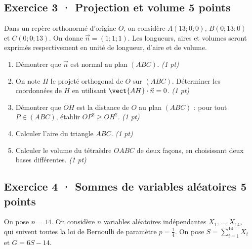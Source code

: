 \clearpage{}\par

\subsection*{Exercice 3 · Projection et volume \hfill 5 points}Dans un repère orthonormé d'origine $O$, on considère $A(13;0;0)$, $B(0;13;0)$ et $C(0;0;13)$. On donne $\vec n=(1;1;1)$. Les longueurs, aires et volumes seront exprimés respectivement en unité de longueur, d'aire et de volume.

\begin{enumerate}

\item Démontrer que $\vec n$ est normal au plan $(ABC)$. \hfill\textit{(1 pt)}

\item On note $H$ le projeté orthogonal de $O$ sur $(ABC)$. Déterminer les coordonnées de $H$ en utilisant $\vect{AH}\cdot\vec n=0$. \hfill\textit{(1 pt)}

\item Démontrer que $OH$ est la distance de $O$ au plan $(ABC)$ : pour tout $P\in(ABC)$, établir $OP^2\ge OH^2$. \hfill\textit{(1 pt)}

\item Calculer l'aire du triangle $ABC$. \hfill\textit{(1 pt)}

\item Calculer le volume du tétraèdre $OABC$ de deux façons, en choisissant deux bases différentes. \hfill\textit{(1 pt)}

\end{enumerate}

\subsection*{Exercice 4 · Sommes de variables aléatoires \hfill 5 points}On pose $n=14$. On considère $n$ variables aléatoires indépendantes $X_1,\ldots,X_{14}$, qui suivent toutes la loi de Bernoulli de paramètre $p=\frac{1}{4}$. On pose $S=\displaystyle\sum_{i=1}^{14}X_i$ et $G=6S-14$.

